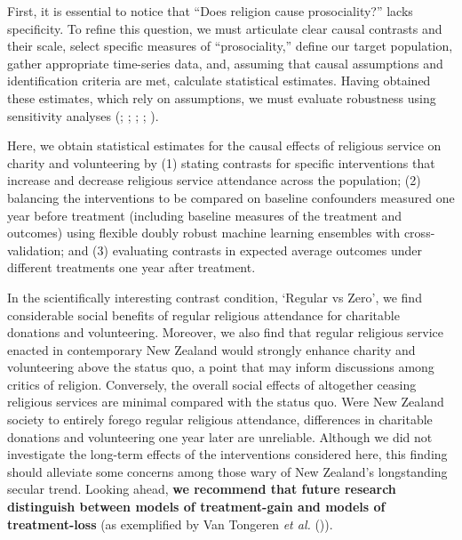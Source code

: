 \documentclass[
  single column]{article}
\begin{document}
First, it is essential to notice that ``Does religion cause
prosociality?'' lacks specificity. To refine this question, we must
articulate clear causal contrasts and their scale, select specific
measures of ``prosociality,'' define our target population, gather
appropriate time-series data, and, assuming that causal assumptions and
identification criteria are met, calculate statistical estimates. Having
obtained these estimates, which rely on assumptions, we must evaluate
robustness using sensitivity analyses
(;
;
;
;
).

Here, we obtain statistical estimates for the causal effects of
religious service on charity and volunteering by (1) stating contrasts
for specific interventions that increase and decrease religious service
attendance across the population; (2) balancing the interventions to be
compared on baseline confounders measured one year before treatment
(including baseline measures of the treatment and outcomes) using
flexible doubly robust machine learning ensembles with cross-validation;
and (3) evaluating contrasts in expected average outcomes under
different treatments one year after treatment.

In the scientifically interesting contrast condition, `Regular vs Zero',
we find considerable social benefits of regular religious attendance for
charitable donations and volunteering. Moreover, we also find that
regular religious service enacted in contemporary New Zealand would
strongly enhance charity and volunteering above the status quo, a point
that may inform discussions among critics of religion. Conversely, the
overall social effects of altogether ceasing religious services are
minimal compared with the status quo. Were New Zealand society to
entirely forego regular religious attendance, differences in charitable
donations and volunteering one year later are unreliable. Although we
did not investigate the long-term effects of the interventions
considered here, this finding should alleviate some concerns among those
wary of New Zealand's longstanding secular trend. Looking ahead,
\textbf{we recommend that future research distinguish between models of
treatment-gain and models of treatment-loss} (as exemplified by Van
Tongeren \emph{et al.} ()).
\end{document}
